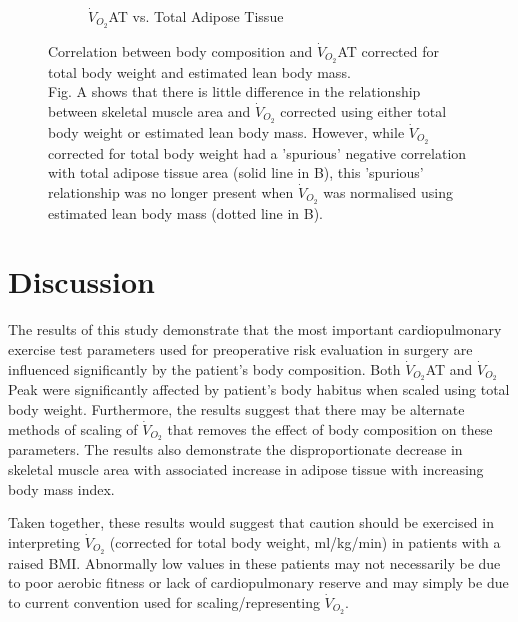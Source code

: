 \begin{figure}[htb]
\begin{subfigure}[b]{0.45\textwidth}
		\caption{$\dot{V}_{O_2}$AT vs. 
Total Adipose Tissue}
		\label{fig:bc_scatter_VO2_TAT_elbm}
	\end{subfigure}
	\caption[Correlation between body composition and $\dot{V}_{O_2}$AT corrected for total body weight and estimated lean body mass.]
	{Correlation between body composition and $\dot{V}_{O_2}$AT corrected for total body weight and estimated lean body mass.
	\\ Fig. A shows that there is little difference in the relationship between skeletal muscle area and $\dot{V}_{O_2}$ corrected using either total body weight or estimated lean body mass. However, while $\dot{V}_{O_2}$ corrected for total body weight had a 'spurious' negative correlation with total adipose tissue area (solid line in B), this 'spurious' relationship was no longer present when $\dot{V}_{O_2}$ was normalised using estimated lean body mass (dotted line in B).}
	\label{fig:bc_scatter_VO2_bodycomp_elbm}
\end{figure}



\clearpage

\section{Discussion}

The results of this study demonstrate that the most important cardiopulmonary exercise test parameters used for preoperative risk evaluation in surgery are influenced significantly by the patient's body composition. 
Both $\dot{V}_{O_2}$AT and $\dot{V}_{O_2}$Peak were significantly affected by patient's body habitus when scaled using total body weight. 
Furthermore, the results suggest that there may be alternate methods of scaling of $\dot{V}_{O_2}$ that removes the effect of body composition on these parameters. 
The results also demonstrate the disproportionate decrease in skeletal muscle area with associated increase in adipose tissue with increasing body mass index. 

Taken together, these results would suggest that caution should be exercised in interpreting $\dot{V}_{O_2}$ (corrected for total body weight, ml/kg/min) in patients with a raised BMI.
Abnormally low values in these patients may not necessarily be due to poor aerobic fitness or lack of cardiopulmonary reserve and may simply be due to current convention used for scaling/representing $\dot{V}_{O_2}$.

